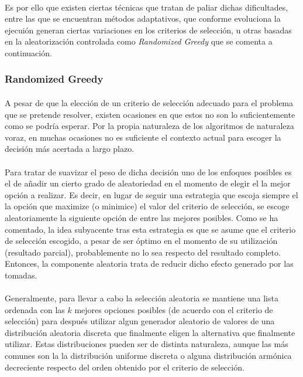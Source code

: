\documentclass{subfiles}
\begin{document}
          \paragraph{}
          Es por ello que existen ciertas técnicas que tratan de paliar dichas dificultades, entre las que se encuentran métodos adaptativos, que conforme evoluciona la ejecuión generan ciertas variaciones en los criterios de selección, u otras basadas en la aleatorización controlada como \emph{Randomized Greedy} que se comenta a continuación.

        \subsubsection{Randomized Greedy}
        \label{sec:solving_randomized_greedy}

          \paragraph{}
          A pesar de que la elección de un criterio de selección adecuado para el problema que se pretende resolver, existen ocasiones en que estos no son lo suficientemente  como se podría esperar. Por la propia naturaleza de los algoritmos de naturaleza voraz, en muchas ocasiones no es suficiente el contexto actual para escoger la decisión más acertada a largo plazo.

          \paragraph{}
          Para tratar de suavizar el peso de dicha decisión uno de los enfoques posibles es el de añadir un cierto grado de aleatoriedad en el momento de elegir el la mejor opción a realizar. Es decir, en lugar de seguir una estrategia que escoja siempre el la opción que maximize (o minimice) el valor del criterio de selección, se escoge aleatoriamente la siguiente opción de entre las mejores posibles. Como se ha comentado, la idea subyacente tras esta estrategia es que se asume que el criterio de selección escogido, a pesar de ser óptimo en el momento de su utilización (resultado parcial), probablemente no lo sea respecto del resultado completo. Entonces, la componente aleatoria trata de reducir dicho efecto generado por las  tomadas.

          \paragraph{}
          Generalmente, para llevar a cabo la selección aleatoria se mantiene una lista ordenada con las $k$ mejores opciones posibles (de acuerdo con el criterio de selección) para después utilizar algun generador aleatorio de valores de una distribución aleatoria discreta que finalmente eligen la alternativa que finalmente utilizar. Estas distribuciones pueden ser de distinta naturaleza, aunque las más comunes son la la distribución uniforme discreta o alguna distribución armónica decreciente respecto del orden obtenido por el criterio de selección.
\end{document}
